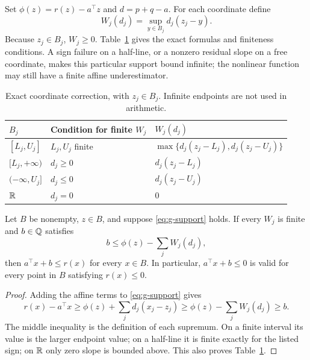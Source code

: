 Set $\phi(z)=r(z)-a^\top z$ and $d=p+q-a$. For each coordinate define
\begin{equation}
 W_j(d_j)=\sup_{y\in B_j} d_j(z_j-y).
 \label{eq:worst-shift}
\end{equation}
Because $z_j\in B_j$, $W_j\geq0$. Table~\ref{tab:shift} gives the exact formulas and finiteness conditions. A sign failure on a half-line, or a nonzero residual slope on a free coordinate, makes this particular support bound infinite; the nonlinear function may still have a finite affine underestimator.

\begin{table}[htbp]
\centering
\caption{Exact coordinate correction, with $z_j\in B_j$. Infinite endpoints are not used in arithmetic.}
\label{tab:shift}
\begin{tabular}{lll}
\toprule
$B_j$ & Condition for finite $W_j$ & $W_j(d_j)$\\
\midrule
$[L_j,U_j]$ & $L_j,U_j$ finite & $\max\{d_j(z_j-L_j),d_j(z_j-U_j)\}$\\
$[L_j,+\infty)$ & $d_j\geq0$ & $d_j(z_j-L_j)$\\
$(-\infty,U_j]$ & $d_j\leq0$ & $d_j(z_j-U_j)$\\
$\mathbb{R}$ & $d_j=0$ & $0$\\
\bottomrule
\end{tabular}
\end{table}

\begin{theorem}
\label{thm:safecut}
Let $B$ be nonempty, $z\in B$, and suppose \eqref{eq:g-support} holds. If every $W_j$ is finite and $b\in\mathbb{Q}$ satisfies
\begin{equation}
 b\leq\phi(z)-\sum_jW_j(d_j),
 \label{eq:safe-intercept}
\end{equation}
then $a^\top x+b\leq r(x)$ for every $x\in B$. In particular, $a^\top x+b\leq0$ is valid for every point in $B$ satisfying $r(x)\leq0$.
\end{theorem}
\begin{proof}
Adding the affine terms to \eqref{eq:g-support} gives
\[
 r(x)-a^\top x\geq \phi(z)+\sum_jd_j(x_j-z_j)
 \geq\phi(z)-\sum_jW_j(d_j)\geq b.
\]
The middle inequality is the definition of each supremum. On a finite interval its value is the larger endpoint value; on a half-line it is finite exactly for the listed sign; on $\mathbb{R}$ only zero slope is bounded above. This also proves Table~\ref{tab:shift}.
\end{proof}

